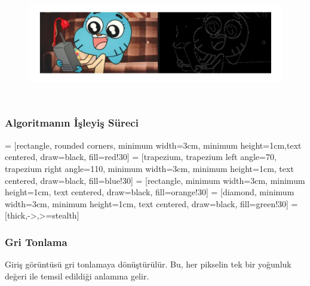 \documentclass[12pt]{article}
\begin{document}
\begin{figure}[h]
    \centering
    \includegraphics[width=7\textwidth, height=5cm, keepaspectratio]{e1.png}
    \label{fig:enter-label}
\end{figure}
\subsubsection{Algoritmanın İşleyiş Süreci}
\begin{center}
 = [rectangle, rounded corners, minimum width=3cm, minimum height=1cm,text centered, draw=black, fill=red!30]
 = [trapezium, trapezium left angle=70, trapezium right angle=110, minimum width=3cm, minimum height=1cm, text centered, draw=black, fill=blue!30]
 = [rectangle, minimum width=3cm, minimum height=1cm, text centered, draw=black, fill=orange!30]
 = [diamond, minimum width=3cm, minimum height=1cm, text centered, draw=black, fill=green!30]
 = [thick,->,>=stealth]

\end{center}
\subsubsection{Gri Tonlama}
 Giriş görüntüsü gri tonlamaya dönüştürülür. Bu, her pikselin tek bir yoğunluk değeri ile temsil edildiği anlamına gelir.
\end{document}
